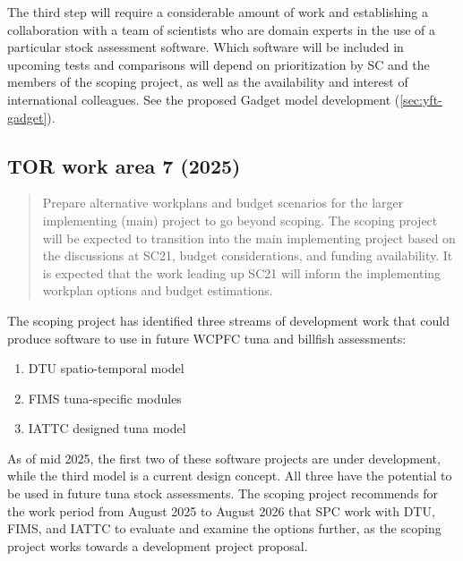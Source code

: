 \documentclass{SCreport}
\begin{document}
\newpage

The third step will require a considerable amount of work and establishing a
collaboration with a team of scientists who are domain experts in the use of a
particular stock assessment software. Which software will be included in
upcoming tests and comparisons will depend on prioritization by SC and the
members of the scoping project, as well as the availability and interest of
international colleagues. See the proposed Gadget model development
(\autoref{sec:yft-gadget}).

\vspace{2ex}

\hypertarget{link:tor-7}{}
\subsection{TOR work area 7 (2025)}
\label{sec:tor-7}

\begin{quote}\sf
  Prepare alternative workplans and budget scenarios for the larger implementing
  (main) project to go beyond scoping. The scoping project will be expected to
  transition into the main implementing project based on the discussions at
  SC21, budget considerations, and funding availability. It is expected that the
  work leading up SC21 will inform the implementing workplan options and budget
  estimations.
\end{quote}

\vspace{2ex}

The scoping project has identified three streams of development work that could
produce software to use in future WCPFC tuna and billfish assessments:

\begin{enumerate}
  \item DTU spatio-temporal model\\[-4.5ex]
  \item FIMS tuna-specific modules\\[-4.5ex]
  \item IATTC designed tuna model
\end{enumerate}

As of mid 2025, the first two of these software projects are under development,
while the third model is a current design concept. All three have the potential
to be used in future tuna stock assessments. The scoping project recommends for
the work period from August 2025 to August 2026 that SPC work with DTU, FIMS,
and IATTC to evaluate and examine the options further, as the scoping project
works towards a development project proposal.
\end{document}
